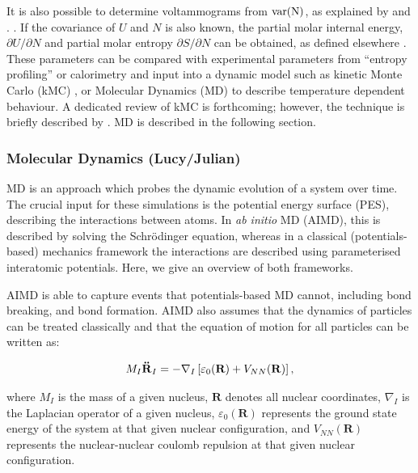 \documentclass[../main.tex]{subfiles}
\begin{document}
It is also possible to determine voltammograms from $\rm{var}(N)$, as explained by \citeauthor{darling1999} and \citeauthor{mercer_influence_2017}. \cite{darling1999,mercer_influence_2017}. If the covariance of $U$ and $N$ is also known, the partial molar internal energy, $\partial{U}/\partial{N}$ and partial molar entropy $\partial{S}/\partial{N}$ can be obtained, as defined elsewhere \cite{mercer_influence_2017,Kim2001h}. These parameters can be compared with experimental parameters from ``entropy profiling'' or calorimetry \cite{mercer_influence_2017,schlueter_quantifying_2018, Mercer2019,THOMAS2003844,zhang2017} and input into a dynamic model such as kinetic Monte Carlo (kMC) \cite{gavilan-arriazu_kinetic_2020,darling1999,gavilan-arriazu_effect_2020,persson2010}, or Molecular Dynamics (MD) to describe temperature dependent behaviour. A dedicated review of kMC is forthcoming; however, the technique is briefly described by \citeauthor{VanderVen2020}.\cite{VanderVen2020} MD is described in the following section.

\subsubsection{Molecular Dynamics (Lucy/Julian)}
\label{sec:molecular_dynamics}
MD is an approach which probes the dynamic evolution of a system over time. The crucial input for these simulations is the potential energy surface (PES), describing the interactions between atoms. In \textit{ab initio} MD (AIMD), this is described by solving the Schr\"{o}dinger equation, whereas in a classical (potentials-based) mechanics framework the interactions are described using parameterised interatomic potentials. Here, we give an overview of both frameworks.

AIMD is able to capture events that potentials-based MD cannot, including bond breaking, and bond formation. AIMD also assumes that the dynamics of particles can be treated classically and that the equation of motion for all particles can be written as:

\begin{equation}
    \label{eq:eom}
    M_I \textrm{\textbf{\"{R}}} _I=-\nabla_I\left[ \varepsilon_0(\textbf{R})+V_{NN}(\mathbf{R})\right],
\end{equation}

where $M_I$ is the mass of a given nucleus, $\textbf{R}$ denotes all nuclear coordinates, $\nabla_I$ is the Laplacian operator of a given nucleus, $\varepsilon_0(\textbf{R})$ represents the ground state energy of the system at that given nuclear configuration, and $V_{NN}(\textbf{R})$ represents the nuclear-nuclear coulomb repulsion at that given nuclear configuration.
\end{document}
